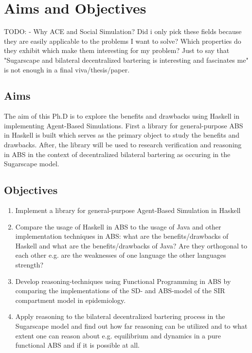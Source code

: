 \chapter{Aims and Objectives}
\label{chap:aimsObj}

TODO:
- Why ACE and Social Simulation? Did i only pick these fields because they are easily applicable to the problems I want to solve? Which properties do they exhibit which make them interesting for my problem? Just to say that "Sugarscape and bilateral decentralized bartering is interesting and fascinates me" is not enough in a final viva/thesis/paper.	

\section{Aims}
The aim of this Ph.D is to explore the benefits and drawbacks using Haskell in implementing Agent-Based Simulations. First a library for general-purpose ABS in Haskell is built which serves as the primary object to study the benefits and drawbacks. After, the library will be used to research verification and reasoning in ABS in the context of decentralized bilateral bartering as occuring in the Sugarscape model.

\section{Objectives}
\begin{enumerate}
	\item Implement a library for general-purpose Agent-Based Simulation in Haskell 
	\item Compare the usage of Haskell in ABS to the usage of Java and other implementation techniques in ABS: what are the benefits/drawbacks of Haskell and what are the benefits/drawbacks of Java? Are they orthogonal to each other e.g. are the weaknesses of one language the other languages strength?

	\item Develop reasoning-techniques using Functional Programming in ABS by comparing the implementations of the SD- and ABS-model of the SIR compartment model in epidemiology.
	\item Apply reasoning to the bilateral decentralized bartering process in the Sugarscape model and find out how far reasoning can be utilized and to what extent one can reason about e.g. equilibrium and dynamics in a pure functional ABS and if it is possible at all.
\end{enumerate}

